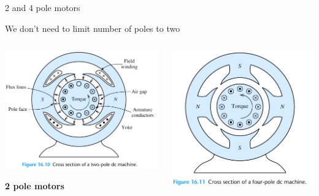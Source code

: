 \documentclass[compress]{beamer}
\begin{document}
\begin{frame}{2 and 4 pole motors}

    We don't need to limit number of poles to two

    \begin{columns}
        \begin{column}{0.5\linewidth}
            \begin{center}
                \includegraphics[height=0.5\paperheight]{image48}

                \textbf{2 pole motors}
            \end{center}
        \end{column}
        \begin{column}{0.5\linewidth}

            \begin{center}
                \includegraphics[height=0.5\paperheight]{image49}


\end{center}
\end{column}
\end{columns}
\end{frame}
\end{document}
